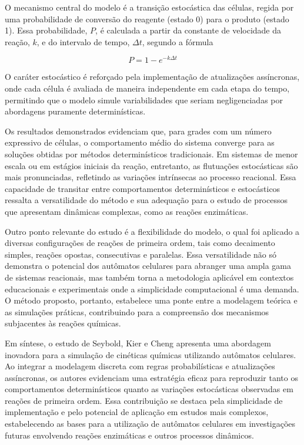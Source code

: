 \documentclass[12pt,oneside]{report}
\begin{document}
O mecanismo central do modelo é a transição estocástica das células, regida por uma probabilidade de conversão do reagente (estado 0) para o produto (estado 1). Essa probabilidade, $P$, é calculada a partir da constante de velocidade da reação, $k$, e do intervalo de tempo, $\Delta t$, segundo a fórmula

\begin{equation}
    P = 1 - e^{-k \Delta t}
\end{equation}

O caráter estocástico é reforçado pela implementação de atualizações assíncronas, onde cada célula é avaliada de maneira independente em cada etapa do tempo, permitindo que o modelo simule variabilidades que seriam negligenciadas por abordagens puramente determinísticas.

Os resultados demonstrados evidenciam que, para grades com um número expressivo de células, o comportamento médio do sistema converge para as soluções obtidas por métodos determinísticos tradicionais. Em sistemas de menor escala ou em estágios iniciais da reação, entretanto, as flutuações estocásticas são mais pronunciadas, refletindo as variações intrínsecas ao processo reacional. Essa capacidade de transitar entre comportamentos determinísticos e estocásticos ressalta a versatilidade do método e sua adequação para o estudo de processos que apresentam dinâmicas complexas, como as reações enzimáticas.

Outro ponto relevante do estudo é a flexibilidade do modelo, o qual foi aplicado a diversas configurações de reações de primeira ordem, tais como decaimento simples, reações opostas, consecutivas e paralelas. Essa versatilidade não só demonstra o potencial dos autômatos celulares para abranger uma ampla gama de sistemas reacionais, mas também torna a metodologia aplicável em contextos educacionais e experimentais onde a simplicidade computacional é uma demanda. O método proposto, portanto, estabelece uma ponte entre a modelagem teórica e as simulações práticas, contribuindo para a compreensão dos mecanismos subjacentes às reações químicas.

Em síntese, o estudo de Seybold, Kier e Cheng \cite{seybold1997simulation} apresenta uma abordagem inovadora para a simulação de cinéticas químicas utilizando autômatos celulares. Ao integrar a modelagem discreta com regras probabilísticas e atualizações assíncronas, os autores evidenciam uma estratégia eficaz para reproduzir tanto os comportamentos determinísticos quanto as variações estocásticas observadas em reações de primeira ordem. Essa contribuição se destaca pela simplicidade de implementação e pelo potencial de aplicação em estudos mais complexos, estabelecendo as bases para a utilização de autômatos celulares em investigações futuras envolvendo reações enzimáticas e outros processos dinâmicos.
\end{document}
